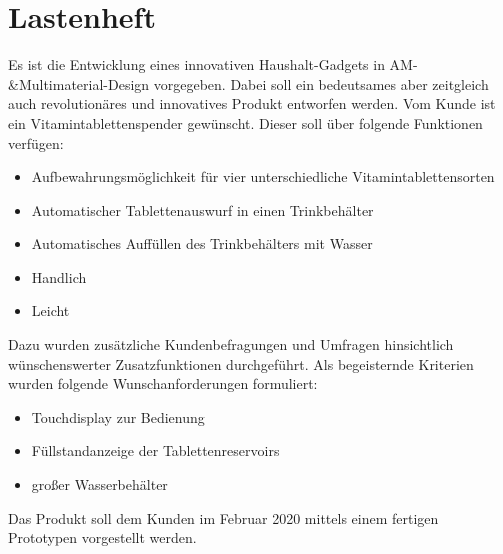\chapter{Lastenheft}

Es ist die Entwicklung eines innovativen Haushalt-Gadgets in AM-\&Multimaterial-Design vorgegeben. Dabei soll ein bedeutsames aber zeitgleich auch revolutionäres und innovatives Produkt entworfen werden. Vom Kunde ist ein Vitamintablettenspender gewünscht. Dieser soll über folgende Funktionen verfügen:
\begin{itemize}
\item Aufbewahrungsmöglichkeit für vier unterschiedliche Vitamintablettensorten
\item Automatischer Tablettenauswurf in einen Trinkbehälter
\item Automatisches Auffüllen des Trinkbehälters mit Wasser
\item Handlich
\item Leicht
\end{itemize}
Dazu wurden zusätzliche Kundenbefragungen und Umfragen hinsichtlich wünschenswerter Zusatzfunktionen durchgeführt. Als begeisternde Kriterien wurden folgende Wunschanforderungen formuliert:
\begin{itemize}
\item Touchdisplay zur Bedienung
\item Füllstandanzeige der Tablettenreservoirs
\item großer Wasserbehälter
\end{itemize}
Das Produkt soll dem Kunden im Februar 2020 mittels einem fertigen Prototypen vorgestellt werden.